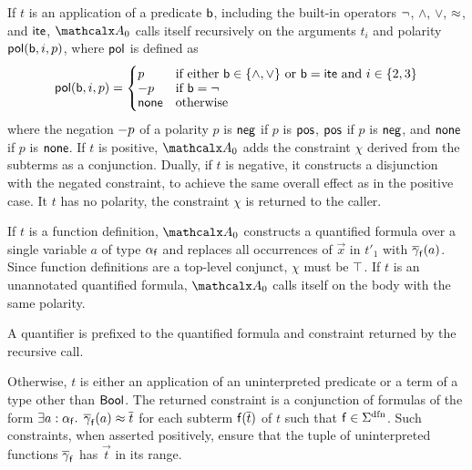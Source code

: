 If $t$ is an application of a predicate $\mathsf{b}$, including the built-in
operators ${\oldneg}$, ${\wedge}$, ${\vee}$, ${\approx}$, and ${\mathsf{ite}}$,
$\conv_0$ calls itself recursively on the arguments $t_i$ and polarity $\mathsf{pol}(
\mathsf{b}, i, p )$, where $\mathsf{pol}$ is defined as
\[\pol( \boolop, i, p ) =
\begin{cases}
p & \text{if either $\boolop \in \{{\wedge}, {\vee}\}$ or $\boolop = \lite$ and $i \in \{2, 3\}$} \\[-\jot]
\pnegate p & \text{if $\boolop = {\neg}$} \\[-\jot]
\pnone & \text{otherwise}
\end{cases}\]
where the negation $- p$ of a polarity $p$ is $\mathsf{neg}$ if $p$ is $\mathsf{pos}$, $\mathsf{pos}$
if $p$ is $\mathsf{neg}$, and $\mathsf{none}$ if $p$ is $\mathsf{none}$.
If $t$ is positive, $\conv_0$ adds the constraint $\chi$ derived from
the subterms as a conjunction. Dually, if $t$ is negative, it constructs a
disjunction with the negated constraint, to achieve the same overall effect as
in the positive case. It $t$ has no polarity, the constraint $\chi$ is
returned to the caller.
%
\begin{longv}\par\end{longv}
%
If $t$ is a function definition, %
$\conv_0$ constructs a quantified formula over a single variable
$a$ of type $\alpha_{\mathsf{f}}$ and replaces all occurrences of $\vec x$ in
$t'_1$ with $\overline{\gamma}_{\mathsf{f}}( a )$. Since function definitions
are a top-level conjunct, %
$\chi$ must be $\top$.
If $t$ is an unannotated quantified formula, $\conv_0$ calls itself
on the body with the same polarity. \begin{longv}A quantifier is prefixed to the
quantified formula and constraint returned by the recursive call.\end{longv}
Otherwise, $t$ is either an application of an uninterpreted predicate or a term
of a type other than $\mathsf{Bool}$. The returned constraint is a conjunction of
formulas of the form $\exists a : {\alpha_{\mathsf{f}}}.\;\, \overline{\gamma}_{\mathsf{f}}(
a ) \approx \overline{t}$ for each subterm $\mathsf{f}( \overline{t} )$ of $t$ such that $\con{f}
\in \sfundefs{\Sigma}$. Such constraints, when asserted positively, ensure that
the tuple of uninterpreted functions $\overline{\gamma}_{\mathsf{f}}$ has $\vec t$
in its range.


